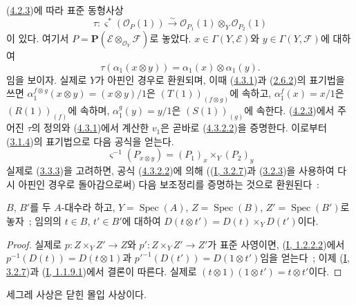 \begin{env}[4.3.2]
\label{II.4.3.2-ko}
(\hyperref[II.4.2.3-ko]{4.2.3})에 따라 표준 동형사상
\[
\label{II.4.3.2.1-ko}
  \tau:\varsigma^*(\mathcal{O}_P(1))\xrightarrow{\sim}
  \mathcal{O}_{P_1}(1)\otimes_Y\mathcal{O}_{P_2}(1)
\tag{4.3.2.1}
\]
이 있다. 여기서
$P=\mathbf{P}(\mathcal{E}\otimes_{\mathcal{O}_Y}\mathcal{F})$로 놓았다.
$x\in\Gamma(Y,\mathcal{E})$와 $y\in\Gamma(Y,\mathcal{F})$에 대하여
\[
\label{II.4.3.2.2-ko}
  \tau(\alpha_1(x\otimes y))=\alpha_1(x)\otimes\alpha_1(y).
\tag{4.3.2.2}
\]
임을 보이자. 실제로 $Y$가 아핀인 경우로 환원되며, 이때
(\hyperref[II.4.3.1-ko]{4.3.1})과
(\hyperref[II.2.6.2-ko]{2.6.2})의 표기법을 쓰면
$\alpha_1^{f\otimes g}(x\otimes y)=(x\otimes y)/1$은
$(T(1))_{(f\otimes g)}$에 속하고, $\alpha_1^f(x)=x/1$은
$(R(1))_{(f)}$에 속하며, $\alpha_1^g(y)=y/1$은 $(S(1))_{(g)}$에
속한다. (\hyperref[II.4.2.3-ko]{4.2.3})에서 주어진 $\tau$의 정의와
(\hyperref[II.4.3.1-ko]{4.3.1})에서 계산한 $v_1$은 곧바로
(\hyperref[II.4.3.2.2-ko]{4.3.2.2})을 증명한다. 이로부터
(\hyperref[II.3.1.4-ko]{3.1.4})의 표기법으로 다음 공식을 얻는다.
\[
\label{II.4.3.2.3-ko}
  \varsigma^{-1}(P_{x\otimes y})=(P_1)_x\times_Y(P_2)_y
\tag{4.3.2.3}
\]
실제로 (\hyperref[II.3.3.3-ko]{3.3.3})을 고려하면, 공식
(\hyperref[II.4.3.2.2-ko]{4.3.2.2})에 의해
((\hyperref[I.3.2.7-ko]{I, 3.2.7})과
(\hyperref[I.3.2.3-ko]{3.2.3})을 사용하여 다시 아핀인 경우로
돌아감으로써) 다음 보조정리를 증명하는 것으로 환원된다~:

\begin{lemma}[4.3.2.4]
\label{II.4.3.2.4-ko}
$B$, $B'$를 두 $A$-대수라 하고,
$Y=\operatorname{Spec}(A)$, $Z=\operatorname{Spec}(B)$,
$Z'=\operatorname{Spec}(B')$로 놓자~; 임의의 $t\in B$, $t'\in B'$에
대하여
$D(t\otimes t')=D(t)\times_YD(t')$이다.
\end{lemma}

\begin{proof}
실제로 $p:Z\times_YZ'\to Z$와 $p':Z\times_YZ'\to Z'$가 표준
사영이면, (\hyperref[I.1.2.2.2-ko]{I, 1.2.2.2})에서
$p^{-1}(D(t))=D(t\otimes1)$과
$p'^{-1}(D(t'))=D(1\otimes t')$임을 얻는다~; 이제
(\hyperref[I.3.2.7-ko]{I, 3.2.7})과
(\hyperref[I.1.1.9.1-ko]{I, 1.1.9.1})에서 결론이 따른다. 실제로
$(t\otimes1)(1\otimes t')=t\otimes t'$이다.
\end{proof}
\end{env}

\begin{proposition}[4.3.3]
\label{II.4.3.3-ko}
세그레 사상은 닫힌 몰입 사상이다.
\end{proposition}

